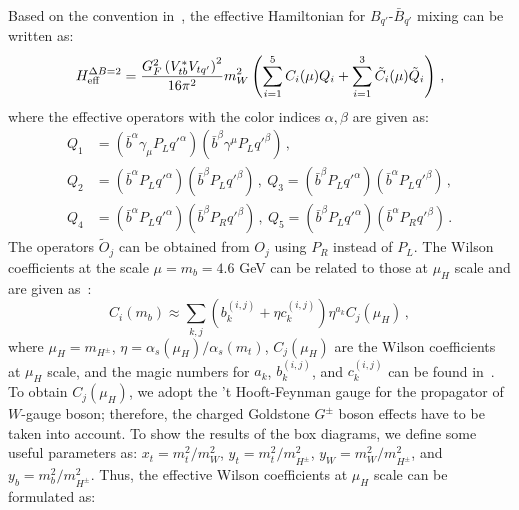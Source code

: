 \documentclass[prd,preprint,superscriptaddress,amsmath,amssymb]{revtex4}
\begin{document}
Based on the convention in~\cite{Becirevic:2001jj}, the effective Hamiltonian for $B_{q'}$-$\bar B_{q'}$ mixing can be written as:
 \begin{equation}
 H^{\Delta B=2}_{\rm eff} = \frac{ G^2_F \left( V^*_{tb} V_{tq'}\right)^2 }{16 \pi^2} m^2_W  \left( \sum^5_{i=1}  C_i (\mu) Q_{i}  + \sum^3_{i=1} \tilde C_i (\mu) \tilde{Q}_i \right)\,, 
 \end{equation}
where the effective operators with the color indices $\alpha,\beta$ are given as:
 \begin{align}
 Q_1 & = \left(\bar b^\alpha \gamma_\mu P_L q'^\alpha \right)  \left(\bar b^\beta \gamma^\mu P_L q'^\beta \right) \,, \nonumber \\
 Q_2 &=  \left(\bar b^\alpha P_L q'^\alpha \right)  \left(\bar b^\beta P_L q'^\beta  \right) \,,  \ Q_3  = \left(\bar b^\beta P_L q'^\alpha \right)  \left(\bar b^\alpha P_L q'^\beta \right) \,, \nonumber \\
 Q_4 &= \left( \bar b^\alpha P_L q'^\alpha \right) \left( \bar b^\beta P_R q'^\beta \right)\,, \  Q_5 = \left( \bar b^\beta P_L q'^\alpha \right) \left( \bar b^\alpha P_R q'^\beta \right)\,.
 \end{align}
 The operators $\tilde O_{j}$ can be obtained from $O_{j}$  using $P_R$ instead of $P_L$. The Wilson coefficients at the scale $\mu=m_b=4.6$ GeV can be related to those at $\mu_H$ scale and are given as~\cite{Becirevic:2001jj}:
 \begin{equation}
 C_i(m_b) \approx \sum_{k,j} \left( b^{(i,j)}_k + \eta c^{(i,j)}_k \right) \eta^{a_k} C_j(\mu_H)\,, \label{eq:mbWCs}
 \end{equation}
 where $\mu_H = m_{H^\pm}$, $\eta = \alpha_s(\mu_H)/\alpha_s(m_t)$, $C_j(\mu_H)$ are the Wilson coefficients at $\mu_H$ scale, and the magic numbers for $a_k$, $b^{(i,j)}_k$, and $c^{(i,j)}_k$ can be found in~\cite{Becirevic:2001jj}. To obtain $C_j(\mu_H)$, we adopt the 't Hooft-Feynman gauge for the propagator of $W$-gauge boson;  therefore,  the charged Goldstone $G^\pm$ boson effects have to be taken into account. To show the results of the box diagrams, we define some useful parameters as:  $x_t=m^2_t/m^2_W$, $y_t=m^2_t/m^2_{H^\pm}$, $y_W=m^2_W/m^2_{H^\pm}$, and $y_b = m^2_b/m_{H^\pm}^2$. Thus, the effective Wilson coefficients at $\mu_H$ scale can be  formulated as:
\end{document}
